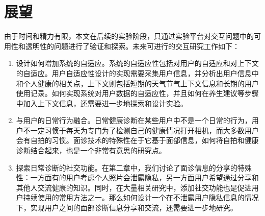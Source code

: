 \section{展望}
由于时间和精力有限，本文在后续的实验阶段，只通过实验平台对交互问题中的可用性和透明性的问题进行了验证和探索。未来可进行的交互研究工作如下：

\begin{enumerate}
	\item 设计如何增加系统的自适应。系统的自适应性包括对用户的自适应和对上下文的自适应。用户自适应性设计的实现需要采集用户信息，并分析出用户信息中和个人健康的相关点，上下文则包括短期的天气节气上下文信息和长期的用户使用记录。如何实现系统对用户数据的自适应性，并且如何在养生建议等步骤中加入上下文信息，还需要进一步地探索和设计实验。

	\item 与用户的日常行为融合。日常健康诊断在某些用户中不是一个日常的行为，用户不一定习惯于每天为专门为了检测自己的健康情况打开相机，而大多数用户会有自拍的习惯。面诊技术的特殊性在于它基于面部信息，如何将自拍和健康诊断结合起来，也是一个非常有意思的研究点。

	\item 探索日常诊断的社交功能。在第二章中，我们讨论了面诊信息的分享的特殊性：一方面有的用户考虑个人照片会泄露隐私，另一方面用户希望通过分享和其他人交流健康的知识。同时，在大量相关研究中，添加社交功能也是促进用户持续使用的常用方法之一。那么如何设计一个在不泄露用户隐私信息的情况下，实现用户之间的面部诊断信息分享和交流，还需要进一步地研究。
	
\end{enumerate}
